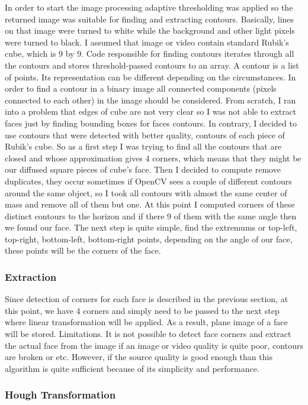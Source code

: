 \documentclass[../../main.tex]{subfiles}
\begin{document}
In order to start the image processing adaptive thresholding was applied so the returned image was suitable for finding and extracting contours. Basically, lines on that image were turned to white while the background and other light pixels were turned to black. I assumed that image or video contain standard Rubik’s cube, which is 9 by 9.
Code responsible for finding contours iterates through all the contours and stores threshold-passed contours to an array. A contour is a list of points. Its representation can be different depending on the circumstances. In order to find a contour in a binary image all connected components (pixels connected to each other) in the image should be considered.
From scratch, I ran into a problem that edges of cube are not very clear so I was not able to extract faces just by finding bounding boxes for faces contours. In contrary, I decided to use contours that were detected with better quality, contours of each piece of Rubik’s cube. So as a first step I was trying to find all the contours that are closed and whose approximation gives 4 corners, which means that they might be our diffused square pieces of cube’s face. Then I decided to compute remove duplicates, they occur sometimes if OpenCV sees a couple of different contours around the same object, so I took all contours with almost the same center of mass and remove all of them but one. At this point I computed corners of these distinct contours to the horizon and if there 9 of them with the same angle then we found our face. The next step is quite simple, find the extremums or top-left, top-right, bottom-left, bottom-right points, depending on the angle of our face, these points will be the corners of the face. 
\subsubsection{Extraction}

Since detection of corners for each face is described in the previous section, at this point, we have 4 corners and simply need to be passed to the next step where linear transformation will be applied. As a result, plane image of a face will be stored.
Limitations. It is not possible to detect face corners and extract the actual face from the image if an image or video quality is quite poor, contours are broken or etc. However, if the source quality is good enough than this algorithm is quite sufficient because of its simplicity and performance.

\subsubsection{Hough Transformation}
\end{document}
